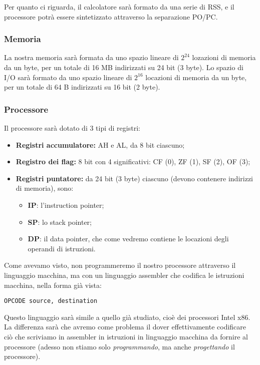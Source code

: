 \documentclass[a4paper,11pt]{article}
\begin{document}
Per quanto ci riguarda, il calcolatore sarà formato da una serie di RSS, e il processore potrà essere sintetizzato attraverso la separazione PO/PC.

\subsubsection{Memoria}
La nostra memoria sarà formata da uno spazio lineare di $2^{24}$ lozazioni di memoria da un byte, per un totale di 16 MB indirizzati su 24 bit (3 byte).
Lo spazio di I/O sarà formato da uno spazio lineare di $2^{16}$ locazioni di memoria da un byte, per un totale di 64 B indirizzati su 16 bit (2 byte).

\subsubsection{Processore}
Il processore sarà dotato di 3 tipi di registri:
\begin{itemize}
	\item \textbf{Registri accumulatore:} AH e AL, da 8 bit ciascuno;
	\item \textbf{Registro dei flag:} 8 bit con 4 significativi: CF (0), ZF (1), SF (2), OF (3);
	\item \textbf{Registri puntatore:} da 24 bit (3 byte) ciascuno (devono contenere indirizzi di memoria), sono:
		\begin{itemize}
			\item \textbf{IP}: l'instruction pointer;
			\item \textbf{SP}: lo stack pointer;
			\item \textbf{DP}: il data pointer, che come vedremo contiene le locazioni degli operandi di istruzioni.
		\end{itemize}
\end{itemize}

Come avevamo visto, non programmeremo il nostro processore attraverso il linguaggio macchina, ma con un linguaggio assembler che codifica le istruzioni macchina, nella forma già vista:
\begin{lstlisting}	
OPCODE source, destination
\end{lstlisting}

Questo linguaggio sarà simile a quello già studiato, cioè dei processori Intel x86.
La differenza sarà che avremo come problema il dover effettivamente codificare ciò che scriviamo in assembler in istruzioni in linguaggio macchina da fornire al processore (adesso non stiamo solo \textit{programmando}, ma anche \textit{progettando} il processore).
\end{document}
